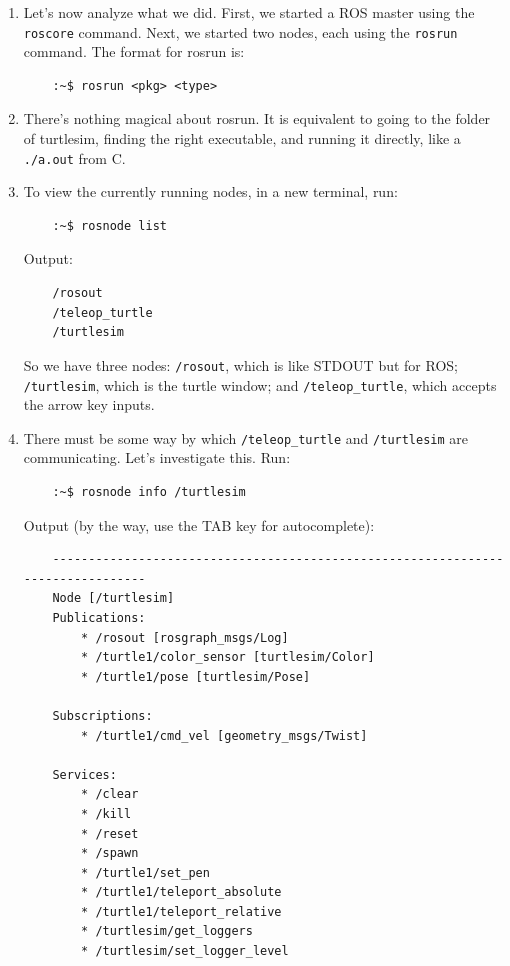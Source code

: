 \documentclass{article}
\begin{document}
\begin{enumerate}
        \item Let's now analyze what we did. First, we started a ROS master using the \texttt{roscore} 
        command. Next, we started two nodes, each using the \texttt{rosrun} command. The format for rosrun is:
        \begin{verbatim}
    :~$ rosrun <pkg> <type>
        \end{verbatim}
        \item There's nothing magical about rosrun. It is equivalent to going to the folder of turtlesim,
        finding the right executable, and running it directly, like a \texttt{./a.out} from C.
        \item To view the currently running nodes, in a new terminal, run:
        \begin{verbatim}
    :~$ rosnode list
        \end{verbatim}
        Output:
        \begin{verbatim}
    /rosout
    /teleop_turtle
    /turtlesim
        \end{verbatim}
        So we have three nodes: \texttt{/rosout}, which is like STDOUT but for ROS; \texttt{/turtlesim}, which is the turtle window;
         and \texttt{/teleop\_turtle}, which accepts the arrow key inputs.
        \item There must be some way by which \texttt{/teleop\_turtle} and \texttt{/turtlesim} are communicating.
        Let's investigate this. Run:
        \begin{verbatim}
    :~$ rosnode info /turtlesim
        \end{verbatim}
        \newpage
        Output (by the way, use the TAB key for autocomplete):
        \begin{verbatim}
    --------------------------------------------------------------------------------
    Node [/turtlesim]
    Publications: 
        * /rosout [rosgraph_msgs/Log]
        * /turtle1/color_sensor [turtlesim/Color]
        * /turtle1/pose [turtlesim/Pose]
    
    Subscriptions: 
        * /turtle1/cmd_vel [geometry_msgs/Twist]
    
    Services: 
        * /clear
        * /kill
        * /reset
        * /spawn
        * /turtle1/set_pen
        * /turtle1/teleport_absolute
        * /turtle1/teleport_relative
        * /turtlesim/get_loggers
        * /turtlesim/set_logger_level
    

\end{verbatim}
\end{enumerate}
\end{document}
